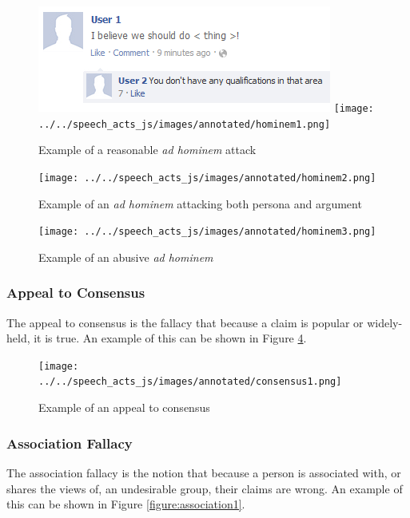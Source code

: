 \begin{figure}[H]
\centering
\includegraphics[scale=.8]{figures/expert/fb_hominem1.png}
\texttt{[image: ../../speech\_acts\_js/images/annotated/hominem1.png]}
\caption{Example of a reasonable \textit{ad hominem} attack}
\label{figure:hominem1}
\end{figure}

\begin{figure}[H]
\centering
\texttt{[image: ../../speech\_acts\_js/images/annotated/hominem2.png]}
\caption{Example of an \textit{ad hominem} attacking both persona and argument }
\label{figure:hominem2}
\end{figure}

\begin{figure}[H]
\centering
\texttt{[image: ../../speech\_acts\_js/images/annotated/hominem3.png]}
\caption{Example of an abusive \textit{ad hominem} }
\label{figure:hominem3}
\end{figure}

\subsubsection{Appeal to Consensus}
The appeal to consensus is the fallacy that because a claim is popular or widely-held, it is true. An example of this can be shown in Figure \ref{figure:consensus1}.

\begin{figure}[H]
\centering
\texttt{[image: ../../speech\_acts\_js/images/annotated/consensus1.png]}
\caption{Example of an appeal to consensus }
\label{figure:consensus1}
\end{figure}

\subsubsection{Association Fallacy}
The association fallacy is the notion that because a person is associated with, or shares the views of, an undesirable group, their claims are wrong. An example of this can be shown in Figure \ref{figure:association1}.

